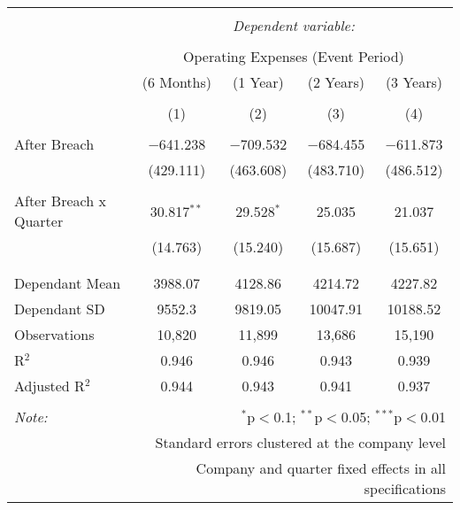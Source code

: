 
\begin{table}[!htbp] \centering 
  \caption{} 
  \label{} 
\begin{tabular}{@{\extracolsep{5pt}}lcccc} 
\\[-1.8ex]\hline 
\hline \\[-1.8ex] 
 & \multicolumn{4}{c}{\textit{Dependent variable:}} \\ 
\cline{2-5} 
\\[-1.8ex] & \multicolumn{4}{c}{Operating Expenses (Event Period)} \\ 
 & (6 Months) & (1 Year) & (2 Years) & (3 Years) \\ 
\\[-1.8ex] & (1) & (2) & (3) & (4)\\ 
\hline \\[-1.8ex] 
 After Breach & $-$641.238 & $-$709.532 & $-$684.455 & $-$611.873 \\ 
  & (429.111) & (463.608) & (483.710) & (486.512) \\ 
  & & & & \\ 
 After Breach x Quarter & 30.817$^{**}$ & 29.528$^{*}$ & 25.035 & 21.037 \\ 
  & (14.763) & (15.240) & (15.687) & (15.651) \\ 
  & & & & \\ 
\hline \\[-1.8ex] 
Dependant Mean & 3988.07 & 4128.86 & 4214.72 & 4227.82 \\ 
Dependant SD & 9552.3 & 9819.05 & 10047.91 & 10188.52 \\ 
Observations & 10,820 & 11,899 & 13,686 & 15,190 \\ 
R$^{2}$ & 0.946 & 0.946 & 0.943 & 0.939 \\ 
Adjusted R$^{2}$ & 0.944 & 0.943 & 0.941 & 0.937 \\ 
\hline 
\hline \\[-1.8ex] 
\textit{Note:}  & \multicolumn{4}{r}{$^{*}$p$<$0.1; $^{**}$p$<$0.05; $^{***}$p$<$0.01} \\ 
 & \multicolumn{4}{r}{Standard errors clustered at the company level} \\ 
 & \multicolumn{4}{r}{Company and quarter fixed effects in all specifications} \\ 
\end{tabular} 
\end{table} 

